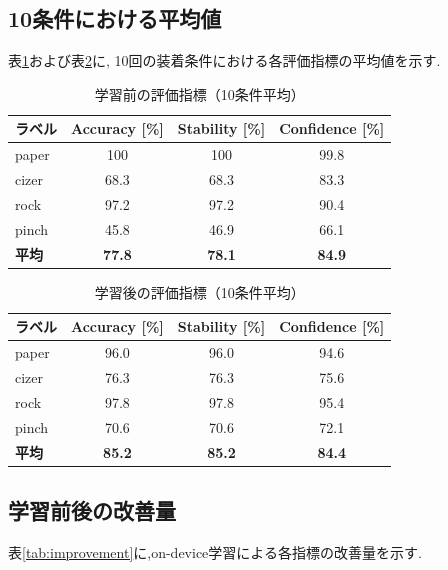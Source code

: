 \subsection{10条件における平均値}
表\ref{tab:results_before}および表\ref{tab:results_after}に,
10回の装着条件における各評価指標の平均値を示す.
\begin{table}[htbp]
  \centering
  \caption{学習前の評価指標（10条件平均）}
  \label{tab:results_before}
  \begin{tabular}{lccc}
    \hline
    ラベル & Accuracy [\%] & Stability [\%] & Confidence [\%] \\
    \hline
    paper & 100 & 100 & 99.8 \\
    cizer & 68.3 & 68.3 & 83.3 \\
    rock  & 97.2 & 97.2 & 90.4 \\
    pinch & 45.8 & 46.9 & 66.1 \\
    \hline
    \textbf{平均} & \textbf{77.8} & \textbf{78.1} & \textbf{84.9} \\
    \hline
  \end{tabular}
\end{table}

\begin{table}[htbp]
  \centering
  \caption{学習後の評価指標（10条件平均）}
  \label{tab:results_after}
  \begin{tabular}{lccc}
    \hline
    ラベル & Accuracy [\%] & Stability [\%] & Confidence [\%] \\
    \hline
    paper & 96.0 & 96.0 & 94.6 \\
    cizer & 76.3 & 76.3 & 75.6 \\
    rock  & 97.8 & 97.8 & 95.4 \\
    pinch & 70.6 & 70.6 & 72.1 \\
    \hline
    \textbf{平均} & \textbf{85.2} & \textbf{85.2} & \textbf{84.4} \\
    \hline
  \end{tabular}
\end{table}


\subsection{学習前後の改善量}

表\ref{tab:improvement}に,on-device学習による各指標の改善量を示す.

